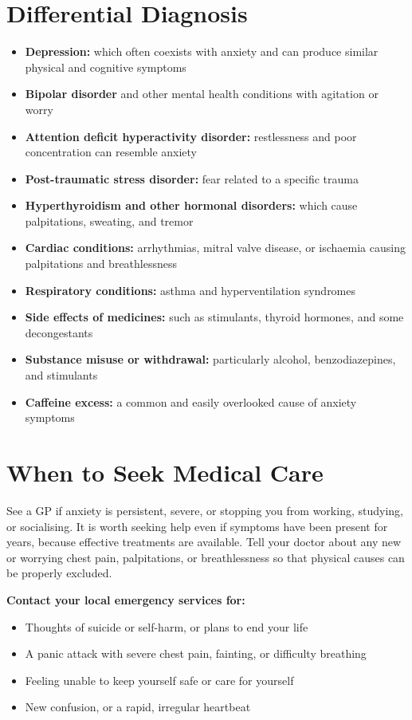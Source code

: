 \section*{Differential Diagnosis}
\begin{itemize}
    \item \textbf{Depression:} which often coexists with anxiety and can produce similar physical and cognitive symptoms
    \item \textbf{Bipolar disorder} and other mental health conditions with agitation or worry
    \item \textbf{Attention deficit hyperactivity disorder:} restlessness and poor concentration can resemble anxiety
    \item \textbf{Post-traumatic stress disorder:} fear related to a specific trauma
    \item \textbf{Hyperthyroidism and other hormonal disorders:} which cause palpitations, sweating, and tremor
    \item \textbf{Cardiac conditions:} arrhythmias, mitral valve disease, or ischaemia causing palpitations and breathlessness
    \item \textbf{Respiratory conditions:} asthma and hyperventilation syndromes
    \item \textbf{Side effects of medicines:} such as stimulants, thyroid hormones, and some decongestants
    \item \textbf{Substance misuse or withdrawal:} particularly alcohol, benzodiazepines, and stimulants
    \item \textbf{Caffeine excess:} a common and easily overlooked cause of anxiety symptoms
\end{itemize}

\section*{When to Seek Medical Care}
See a GP if anxiety is persistent, severe, or stopping you from working, studying, or socialising. It is worth seeking help even if symptoms have been present for years, because effective treatments are available. Tell your doctor about any new or worrying chest pain, palpitations, or breathlessness so that physical causes can be properly excluded.

\textbf{Contact your local emergency services for:}
\begin{itemize}
    \item Thoughts of suicide or self-harm, or plans to end your life
    \item A panic attack with severe chest pain, fainting, or difficulty breathing
    \item Feeling unable to keep yourself safe or care for yourself
    \item New confusion, or a rapid, irregular heartbeat
\end{itemize}

